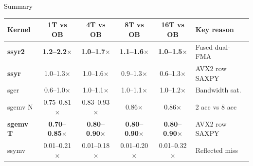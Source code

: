 \documentclass[aspectratio=169,10pt]{beamer}
\begin{document}
\begin{frame}{Summary}
  \begin{center}
  \small
  \begin{tabular}{lccccl}
    \toprule
    Kernel & 1T vs OB & 4T vs OB & 8T vs OB & 16T vs OB & Key reason \\
    \midrule
    \textbf{ssyr2} & \textcolor{hpcgreen}{\textbf{1.2--2.2$\times$}} & \textcolor{hpcgreen}{\textbf{1.0--1.7$\times$}} & \textcolor{hpcgreen}{\textbf{1.1--1.6$\times$}} & \textcolor{hpcgreen}{\textbf{1.0--1.5$\times$}} & Fused dual-FMA \\
    \textbf{ssyr}  & \textcolor{hpcgreen}{1.0--1.3$\times$} & \textcolor{hpcgreen}{1.0--1.6$\times$} & 0.9--1.3$\times$ & 0.6--1.3$\times$ & AVX2 row SAXPY \\
    sger           & 0.6--1.0$\times$ & 1.0--1.1$\times$ & 1.0--1.1$\times$ & 1.0--1.2$\times$ & Bandwidth sat. \\
    sgemv N        & 0.75--0.81$\times$ & 0.83--0.93$\times$ & 0.86$\times$ & 0.86$\times$ & 2 acc vs 8 acc \\
    \textbf{sgemv T} & \textcolor{hpcgreen}{\textbf{0.70--0.85$\times$}} & \textcolor{hpcgreen}{\textbf{0.80--0.90$\times$}} & \textcolor{hpcgreen}{\textbf{0.80--0.90$\times$}} & \textcolor{hpcgreen}{\textbf{0.80--0.90$\times$}} & AVX2 row SAXPY \\
    \textcolor{hpcred}{ssymv}   & \textcolor{hpcred}{0.01--0.21$\times$} & \textcolor{hpcred}{0.01--0.18$\times$} & \textcolor{hpcred}{0.01--0.20$\times$} & \textcolor{hpcred}{0.01--0.32$\times$} & Reflected miss \\
    \bottomrule
  \end{tabular}
  \end{center}


\end{frame}
\end{document}
